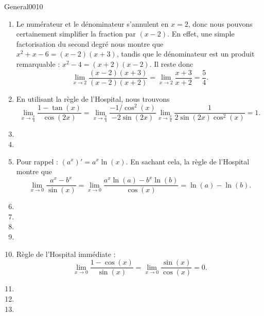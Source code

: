 \begin{corrige}{General0010}

\begin{enumerate}

\item
Le numérateur et le dénominateur s'annulent en $x=2$, donc nous pouvons certainement simplifier la fraction par $(x-2)$. En effet, une simple factorisation du second degré nous montre que $x^2+x-6=(x-2)(x+3)$, tandis que le dénominateur est un produit remarquable : $x^2-4=(x+2)(x-2)$. Il reste donc
\begin{equation}
	\lim_{x\to 2} \frac{ (x-2)(x+3) }{ (x-2)(x+2) }=\lim_{x\to 2} \frac{ x+3 }{ x+2 }=\frac{ 5 }{ 4 }.
\end{equation}

\item
En utilisant la règle de l'Hospital, nous trouvons
\begin{equation}
	\lim_{x\to \frac{ \pi }{ 4 }} \frac{ 1-\tan(x) }{ \cos(2x) }=\lim_{x\to \frac{ \pi }{ 4 }} \frac{ -1/\cos^2(x) }{ -2\sin(2x) }\lim_{x\to \frac{ \pi }{ 4 }} \frac{ 1 }{ 2\sin(2x)\cos^2(x) }=1.
\end{equation}

\item
\item

\item
Pour rappel : $(a^x)'=a^x\ln(x)$. En sachant cela, la règle de l'Hospital montre que
\begin{equation}
	\lim_{x\to 0} \frac{ a^x-b^x }{ \sin(x) }=\lim_{x\to 0} \frac{ a^x\ln(a)-b^x\ln(b) }{ \cos(x) }=\ln(a)-\ln(b).
\end{equation}

\item
\item
\item
\item
\item
Règle de l'Hospital immédiate :
\begin{equation}
	\lim_{x\to 0} \frac{ 1-\cos(x) }{ \sin(x) }=\lim_{x\to 0} \frac{ \sin(x) }{ \cos(x) }=0.
\end{equation}

\item
\item
\item


\end{enumerate}
\end{corrige}
